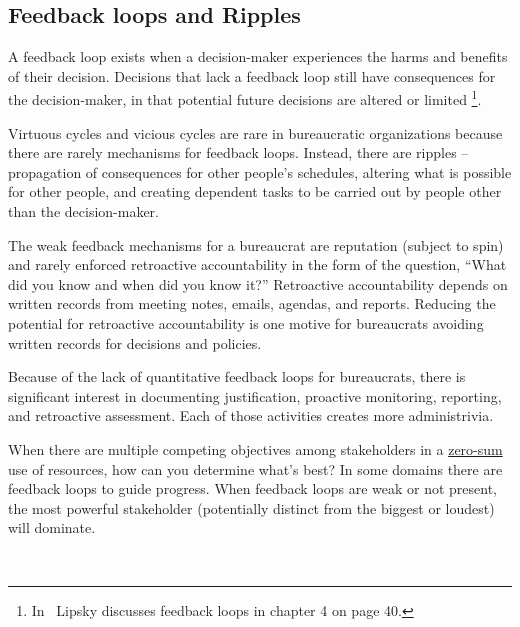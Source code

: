 \subsection*{Feedback loops and Ripples\label{sec:feedback-loop-and-ripples}}



A feedback loop exists when a decision-maker experiences the harms and benefits of their decision. Decisions that lack a feedback loop still have consequences for the decision-maker, in that potential future decisions are altered or limited \footnote{In~\cite{1983_Lipsky} Lipsky discusses feedback loops in chapter 4 on page 40.}.


Virtuous cycles and vicious cycles are rare in bureaucratic organizations because there are rarely mechanisms for feedback loops. Instead, there are \glspl{ripple} -- propagation of consequences for other people's schedules, altering what is possible for other people, and creating dependent tasks to be carried out by people other than the decision-maker.


The weak feedback mechanisms for a bureaucrat are reputation (subject to spin)
and rarely enforced retroactive accountability in the form of the question, ``What did you know and when did you know it?''
Retroactive accountability depends on written records from meeting notes, emails, agendas, and reports. Reducing the potential for retroactive accountability is one motive for bureaucrats avoiding written records for decisions and policies.


Because of the lack of quantitative feedback loops for bureaucrats, there is significant interest in documenting justification, proactive monitoring, reporting, and retroactive assessment. Each of those activities creates more administrivia.


When there are multiple competing objectives among stakeholders in a 
\href{https://en.wikipedia.org/wiki/Zero-sum_game}{zero-sum}
use of resources, how can you determine what's best? In some domains there are feedback loops to guide progress. When feedback loops are weak or not present,  the most powerful stakeholder (potentially distinct from the biggest or loudest) will dominate. 


\ \\

